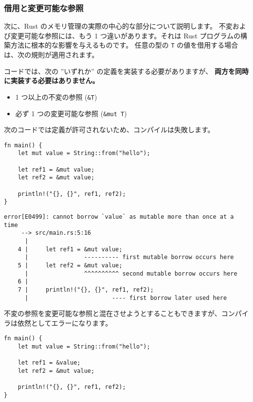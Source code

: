 \subsubsection{借用と変更可能な参照}

次に、Rust のメモリ管理の実際の中心的な部分について説明します。 不変および変更可能な参照には、もう 1 つ違いがあります。それは Rust プログラムの構築方法に根本的な影響を与えるものです。 任意の型の \texttt{T} の値を借用する場合は、次の規則が適用されます。

コードでは、次の ''いずれか'' の定義を実装する必要がありますが、 \textbf{両方を同時に実装する必要はありません。}

\begin{itemize}
\item 1 つ以上の不変の参照 (\texttt{\&T})
\item 必ず 1 つの変更可能な参照 (\texttt{\&mut T})
\end{itemize}

次のコードでは定義が許可されないため、コンパイルは失敗します。

\begin{lstlisting}[numbers=none]
fn main() {
    let mut value = String::from("hello");

    let ref1 = &mut value;
    let ref2 = &mut value;

    println!("{}, {}", ref1, ref2);
}
\end{lstlisting}


\begin{lstlisting}[numbers=none]
    error[E0499]: cannot borrow `value` as mutable more than once at a time
     --> src/main.rs:5:16
      |
    4 |     let ref1 = &mut value;
      |                ---------- first mutable borrow occurs here
    5 |     let ref2 = &mut value;
      |                ^^^^^^^^^^ second mutable borrow occurs here
    6 |
    7 |     println!("{}, {}", ref1, ref2);
      |                        ---- first borrow later used here
\end{lstlisting}

不変の参照を変更可能な参照と混在させようとすることもできますが、コンパイラは依然としてエラーになります。

\begin{lstlisting}[numbers=none]
fn main() {
    let mut value = String::from("hello");

    let ref1 = &value;
    let ref2 = &mut value;

    println!("{}, {}", ref1, ref2);
}
\end{lstlisting}


